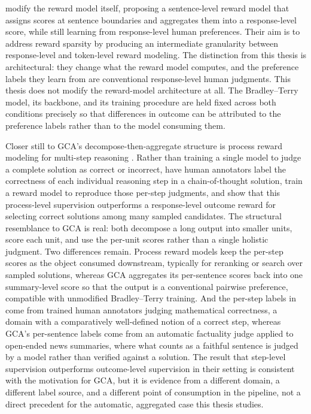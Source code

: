 \citet{qiu2025sentencelevel} modify the reward model itself, proposing a
sentence-level reward model that assigns scores at sentence boundaries and
aggregates them into a response-level score, while still learning from
response-level human preferences. Their aim is to address reward sparsity by
producing an intermediate granularity between response-level and token-level
reward modeling. The distinction from this thesis is architectural: they change
what the reward model computes, and the preference labels they learn from are
conventional response-level human judgments. This thesis does not modify the
reward-model architecture at all. The Bradley--Terry model, its backbone, and its
training procedure are held fixed across both conditions precisely so that
differences in outcome can be attributed to the preference labels rather than to
the model consuming them.

Closer still to GCA's decompose-then-aggregate structure is process reward
modeling for multi-step reasoning \citep{lightman2023verify}. Rather than
training a single model to judge a complete solution as correct or
incorrect, \citet{lightman2023verify} have human annotators label the
correctness of each individual reasoning step in a chain-of-thought
solution, train a reward model to reproduce those per-step judgments, and
show that this process-level supervision outperforms a response-level
outcome reward for selecting correct solutions among many sampled
candidates. The structural resemblance to GCA is real: both decompose a
long output into smaller units, score each unit, and use the per-unit
scores rather than a single holistic judgment. Two differences remain.
Process reward models keep the per-step scores as the object consumed
downstream, typically for reranking or search over sampled solutions,
whereas GCA aggregates its per-sentence scores back into one summary-level
score so that the output is a conventional pairwise preference, compatible
with unmodified Bradley--Terry training. And the per-step labels in
\citet{lightman2023verify} come from trained human annotators judging
mathematical correctness, a domain with a comparatively well-defined notion
of a correct step, whereas GCA's per-sentence labels come from an automatic
factuality judge applied to open-ended news summaries, where what counts as
a faithful sentence is judged by a model rather than verified against a
solution. The result that step-level supervision outperforms outcome-level
supervision in their setting is consistent with the motivation for GCA, but
it is evidence from a different domain, a different label source, and a
different point of consumption in the pipeline, not a direct precedent for
the automatic, aggregated case this thesis studies.

